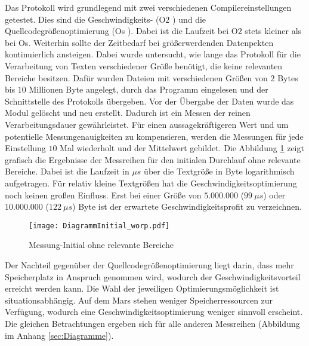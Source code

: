 Das Protokoll wird grundlegend mit zwei verschiedenen
Compilereinstellungen getestet. Dies sind die Geschwindigkeits- (\glqq O$2$
\grqq) und die Quellcodegrößenoptimierung (\glqq Os \grqq). 
\newline
Dabei ist die Laufzeit bei O$2$ stets kleiner als bei Os. Weiterhin sollte der
Zeitbedarf bei größerwerdenden Datenpekten kontinuierlich ansteigen.
\newline
Dabei wurde untersucht, wie lange das Protokoll für die Verarbeitung von Texten
verschiedener Größe benötigt, die keine relevanten Bereiche besitzen. Dafür
wurden Dateien mit verschiedenen Größen von $2$ Bytes bis $10$ Millionen Byte 
angelegt, durch das Programm eingelesen und der Schnittstelle des Protokolls
übergeben. Vor der Übergabe der Daten wurde das Modul gelöscht und neu erstellt.
Dadurch ist ein Messen der reinen Verarbeitungsdauer gewährleistet. Für einen
aussagekräftigeren Wert und um potentielle Messungenauigkeiten zu kompensieren,
werden die Messungen für jede Einstellung $10$ Mal wiederholt und der Mittelwert
gebildet.
\newline
Die Abbildung \ref{fig:diagrammInitial_worp} zeigt grafisch die Ergebnisse der
Messreihen für den initialen Durchlauf ohne relevante Bereiche. Dabei ist die
Laufzeit in $\mu s$ über die Textgröße in Byte logarithmisch aufgetragen. Für
relativ kleine Textgrößen hat die Geschwindigkeitsoptimierung noch keinen großen
Einfluss. Erst bei einer Größe von $5.000.000$ ($99\ \mu s$) oder
$10.000.000$ ($122\ \mu s$) Byte ist der erwartete Geschwindigkeitsprofit zu
verzeichnen.

\begin{figure}[H]
	\centering
	\texttt{[image: DiagrammInitial\_worp.pdf]}
	\label{fig:diagrammInitial_worp}
	\caption{Messung-Initial ohne relevante Bereiche}
\end{figure}

Der Nachteil gegenüber der Quellcodegrößenoptimierung liegt darin, dass
mehr Speicherplatz in Anspruch genommen wird, wodurch der
Geschwindigkeitsvorteil erreicht werden kann.
Die Wahl der jeweiligen Optimierungsmöglichkeit ist situationsabhängig. Auf dem
Mars stehen weniger Speicherressourcen zur Verfügung, wodurch eine
Geschwindigkeitsoptimierung weniger sinnvoll erscheint. Die gleichen
Betrachtungen ergeben sich für alle anderen Messreihen (Abbildung im Anhang
\ref{sec:Diagramme}). 


